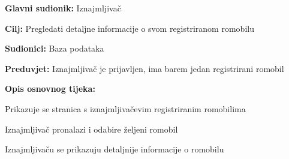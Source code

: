 						\begin{packed_item}
							
							\item \textbf{Glavni sudionik: }Iznajmljivač
							\item  \textbf{Cilj: }Pregledati detaljne informacije o svom registriranom romobilu
							\item  \textbf{Sudionici: }Baza podataka
							\item  \textbf{Preduvjet: }Iznajmljivač je prijavljen, ima barem jedan registrirani romobil
							\item  \textbf{Opis osnovnog tijeka:}
							
							\item[] \begin{packed_enum}
								
								\item Prikazuje se stranica s iznajmljivačevim registriranim romobilima
								\item Iznajmljivač pronalazi i odabire željeni romobil
								\item Iznajmljivaču se prikazuju detaljnije informacije o romobilu
							
							\end{packed_enum}
						\end{packed_item}
						\noindent {}

